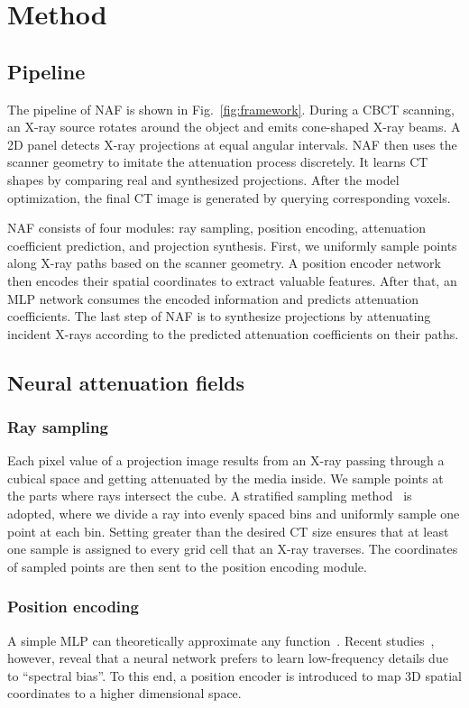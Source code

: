 \documentclass[runningheads]{llncs}
\begin{document}
\section{Method}
\subsection{Pipeline}
The pipeline of NAF is shown in Fig.~\ref{fig:framework}. During a CBCT scanning, an X-ray source rotates around the object and emits cone-shaped X-ray beams. A 2D panel detects X-ray projections at equal angular intervals. NAF then uses the scanner geometry to imitate the attenuation process discretely. It learns CT shapes by comparing real and synthesized projections. After the model optimization, the final CT image is generated by querying corresponding voxels.

NAF consists of four modules: ray sampling, position encoding, attenuation coefficient prediction, and projection synthesis. First, we uniformly sample points along X-ray paths based on the scanner geometry. A position encoder network then encodes their spatial coordinates to extract valuable features. After that, an MLP network consumes the encoded information and predicts attenuation coefficients. The last step of NAF is to synthesize projections by attenuating incident X-rays according to the predicted attenuation coefficients on their paths. 





\subsection{Neural attenuation fields}
\subsubsection{Ray sampling}
Each pixel value of a projection image results from an X-ray passing through a cubical space and getting attenuated by the media inside. We sample  points at the parts where rays intersect the cube. A stratified sampling method~\cite{mildenhall2020nerf} is adopted, where we divide a ray into  evenly spaced bins and uniformly sample one point at each bin. Setting  greater than the desired CT size ensures that at least one sample is assigned to every grid cell that an X-ray traverses. The coordinates of sampled points are then sent to the position encoding module.

\subsubsection{Position encoding}
A simple MLP can theoretically approximate any function~\cite{hornik1989multilayer}. Recent studies~\cite{rahaman2019spectral,tancik2020fourier}, however, reveal that a neural network prefers to learn low-frequency details due to ``spectral bias''. To this end, a position encoder is introduced to map 3D spatial coordinates to a higher dimensional space.
\end{document}
